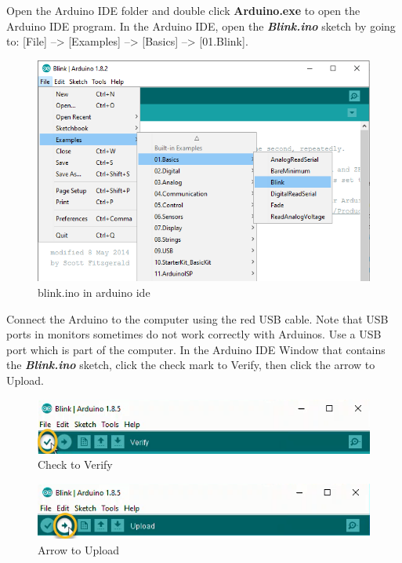 Open the Arduino IDE folder and double click \textbf{Arduino.exe} to
open the Arduino IDE program. In the Arduino IDE, open the
\textbf{\emph{Blink.ino}} sketch by going to: {[}File{]}
--\textgreater{} {[}Examples{]} --\textgreater{} {[}Basics{]}
--\textgreater{} {[}01.Blink{]}.

\begin{figure}[h!]
\centering
\includegraphics{images/blink_in_examples_menu.png}
\caption{blink.ino in arduino ide}
\end{figure}

Connect the Arduino to the computer using the red USB cable. Note that
USB ports in monitors sometimes do not work correctly with Arduinos. Use
a USB port which is part of the computer. In the Arduino IDE Window that
contains the \textbf{\emph{Blink.ino}} sketch, click the check mark to
Verify, then click the arrow to Upload.

\begin{figure}[h!]
\centering
\includegraphics{images/Check_to_Verify.png}
\caption{Check to Verify}
\end{figure}

\begin{figure}[h!]
\centering
\includegraphics{images/Arrow_to_Upload.png}
\caption{Arrow to Upload}
\end{figure}

